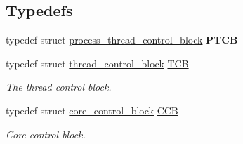 \subsection*{Typedefs}
\begin{DoxyCompactItemize}
\item 
\mbox{\label{group__scheduler_gac8550626ee6df81e5ee46c9693b8cfce}} 
typedef struct \hyperlink{structprocess__thread__control__block}{process\+\_\+thread\+\_\+control\+\_\+block} {\bfseries P\+T\+CB}
\item 
typedef struct \hyperlink{structthread__control__block}{thread\+\_\+control\+\_\+block} \hyperlink{group__scheduler_gaf88d9c946bf70b36a1e8bc34383abfc9}{T\+CB}
\begin{DoxyCompactList}\small\item\em The thread control block. \end{DoxyCompactList}\item 
typedef struct \hyperlink{structcore__control__block}{core\+\_\+control\+\_\+block} \hyperlink{group__scheduler_ga7485b31e0dd9fd723bc2d75fba5206a0}{C\+CB}
\begin{DoxyCompactList}\small\item\em Core control block. \end{DoxyCompactList}\end{DoxyCompactItemize}

